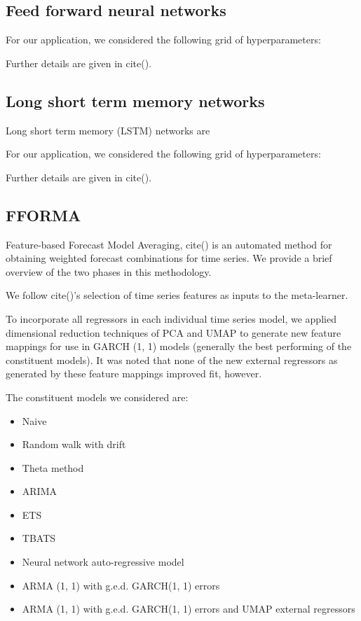 \documentclass{article}
\begin{document}
\subsection{Feed forward neural networks}


For our application, we considered the following grid of hyperparameters:



Further details are given in cite().

\subsection{Long short term memory networks}
Long short term memory (LSTM) networks are 

For our application, we considered the following grid of hyperparameters:

Further details are given in cite().

\subsection{FFORMA}
Feature-based Forecast Model Averaging, cite() is an automated method for obtaining weighted forecast combinations for time series. We provide a brief overview of the two phases in this methodology.

We follow cite()'s selection of time series features as inputs to the meta-learner. 

To incorporate all regressors in each individual time series model, we applied dimensional reduction techniques of PCA and UMAP to generate new feature mappings for use in GARCH (1, 1) models (generally the best performing of the constituent models). It was noted that none of the new external regressors as generated by these feature mappings improved fit, however.

The constituent models we considered are:
\begin{itemize}
	\item Naive
	\item Random walk with drift
	\item Theta method
	\item ARIMA
	\item ETS
	\item TBATS
	\item Neural network auto-regressive model
	\item ARMA (1, 1) with g.e.d. GARCH(1, 1) errors
	\item ARMA (1, 1) with g.e.d. GARCH(1, 1) errors and UMAP external regressors
\end{itemize}
\end{document}
